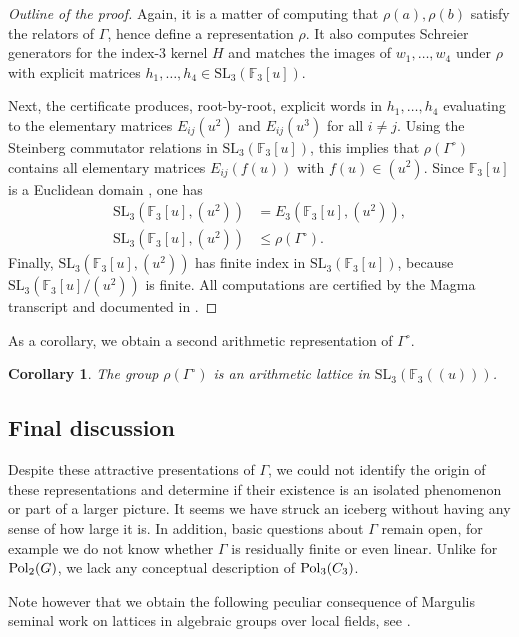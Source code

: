 \documentclass[11pt, a4paper]{amsproc}
\newcommand{\F}{\mathbb{F}}
\newcommand{\SL}{\mathrm{SL}}
\newtheorem{corollary}[cor]{Corollary}
\theoremstyle{remark}
\theoremstyle{plain}
\begin{document}
\begin{proof}[Outline of the proof]
Again, it is a matter of computing that $\rho(a),\rho(b)$ satisfy the relators of $\Gamma$, hence
define a representation $\rho$. It also computes Schreier generators for the index-$3$ kernel $H$ and matches
the images of $w_1,\dots,w_4$ under $\rho$ with explicit matrices $h_1,\dots,h_4\in\SL_3(\F_3[u])$.

Next, the certificate produces, root-by-root, explicit words in $h_1,\dots,h_4$ evaluating to the elementary
matrices $E_{ij}(u^2)$ and $E_{ij}(u^3)$ for all $i\neq j$. Using the Steinberg commutator relations in
$\SL_3(\F_3[u])$, this implies that $\rho(\Gamma^{\circ})$ contains all elementary matrices $E_{ij}(f(u))$ with $f(u)\in (u^2)$.
Since $\F_3[u]$ is a Euclidean domain \cite{bass}, one has
\begin{align*}
\SL_3(\F_3[u],(u^2)) &= E_3(\F_3[u],(u^2)),\\
\SL_3(\F_3[u],(u^2)) &\le \rho(\Gamma^\circ).
\end{align*}
Finally, $\SL_3(\F_3[u],(u^2))$ has finite index in $\SL_3(\F_3[u])$, because $\SL_3(\F_3[u]/(u^2))$ is finite.
All computations are certified by the Magma transcript  and documented in .
\end{proof}

As a corollary, we obtain a second arithmetic representation of $\Gamma^\circ$.

\begin{corollary} The group $\rho(\Gamma^\circ)$ is an arithmetic lattice in $\SL_3(\F_3((u)))$. \end{corollary}

\subsection{Final discussion}

Despite these attractive presentations of $\Gamma$, we could not identify the origin of these representations and determine if their existence is an isolated phenomenon or part of a larger picture. It seems we have struck an iceberg without having any sense of how large it is. In addition, basic questions about $\Gamma$ remain open, for example we do not know whether $\Gamma$ is residually finite or even linear. Unlike for ${\rm Pol}_2(G)$, we lack any conceptual description of ${\rm Pol}_3(C_3)$.

\medskip

Note however that we obtain the following peculiar consequence of Margulis seminal work on lattices in algebraic groups over local fields, see \cite{Margulis}. 
\end{document}
